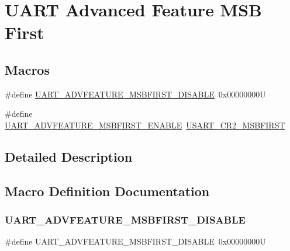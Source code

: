 \hypertarget{group___u_a_r_t___m_s_b___first}{}\section{U\+A\+RT Advanced Feature M\+SB First}
\label{group___u_a_r_t___m_s_b___first}
\subsection*{Macros}
\begin{DoxyCompactItemize}
\item 
\#define \mbox{\hyperlink{group___u_a_r_t___m_s_b___first_gae606b5f132b17af40d58c7d41fad35a5}{U\+A\+R\+T\+\_\+\+A\+D\+V\+F\+E\+A\+T\+U\+R\+E\+\_\+\+M\+S\+B\+F\+I\+R\+S\+T\+\_\+\+D\+I\+S\+A\+B\+LE}}~0x00000000U
\item 
\#define \mbox{\hyperlink{group___u_a_r_t___m_s_b___first_gafb917e79562ccd13909c13056b34302f}{U\+A\+R\+T\+\_\+\+A\+D\+V\+F\+E\+A\+T\+U\+R\+E\+\_\+\+M\+S\+B\+F\+I\+R\+S\+T\+\_\+\+E\+N\+A\+B\+LE}}~\mbox{\hyperlink{group___peripheral___registers___bits___definition_ga7342ab16574cebf157aa885a79986812}{U\+S\+A\+R\+T\+\_\+\+C\+R2\+\_\+\+M\+S\+B\+F\+I\+R\+ST}}
\end{DoxyCompactItemize}


\subsection{Detailed Description}


\subsection{Macro Definition Documentation}
\mbox{\label{group___u_a_r_t___m_s_b___first_gae606b5f132b17af40d58c7d41fad35a5}} 
\subsubsection{\texorpdfstring{UART\_ADVFEATURE\_MSBFIRST\_DISABLE}{UART\_ADVFEATURE\_MSBFIRST\_DISABLE}}
{\footnotesize\ttfamily \#define U\+A\+R\+T\+\_\+\+A\+D\+V\+F\+E\+A\+T\+U\+R\+E\+\_\+\+M\+S\+B\+F\+I\+R\+S\+T\+\_\+\+D\+I\+S\+A\+B\+LE~0x00000000U}


